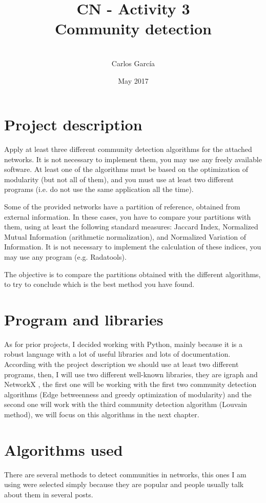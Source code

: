 \documentclass{article}
\title{CN - Activity 3 \\ \bigskip Community detection}
\author{\\ Carlos García}
\date{May 2017}
\begin{document}
\maketitle \newpage \tableofcontents \newpage
\section{Project description}
Apply at least three different community detection algorithms for the attached networks. It is not necessary to implement them, you may use any freely available software. At least one of the algorithms must be based on the optimization of modularity (but not all of them), and you must use at least two different programs (i.e. do not use the same application all the time).

Some of the provided networks have a partition of reference, obtained from external information. In these cases, you have to compare your partitions with them, using at least the following standard measures: Jaccard Index, Normalized Mutual Information (arithmetic normalization), and Normalized Variation of Information. It is not necessary to implement the calculation of these indices, you may use any program (e.g. Radatools).

The objective is to compare the partitions obtained with the different algorithms, to try to conclude which is the best method you have found.
\section{Program and libraries}
As for prior projects, I decided working with Python, mainly because it is a robust language with a lot of useful libraries and lots of documentation.
According with the project description we should use at least two different programs, then, I will use two different well-known libraries, they are igraph \cite{website:igraph} and NetworkX \cite{website:networkx}, the first one will be working with the first two community detection algorithms (Edge betweenness and greedy optimization of modularity) and the second one will work with the third community detection algorithm (Louvain method), we will focus on this algorithms in the next chapter.
\section{Algorithms used}
  There are several methods to detect communities in networks, this ones I am using were selected simply because they are popular and people usually talk about them in several posts.
\end{document}
